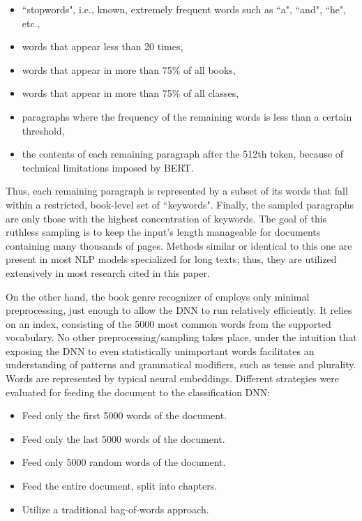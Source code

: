 \documentclass[preprint,review,10pt]{elsarticle}
\begin{document}
	\begin{itemize}
		\item ``stopwords", i.e., known, extremely frequent words such as ``a", ``and", ``he", etc.,
		\item words that appear less than 20 times,
		\item words that appear in more than 75\% of all books,
		\item words that appear in more than 75\% of all classes,
		\item paragraphs where the frequency of the remaining words is less than a certain threshold,
		\item the contents of each remaining paragraph after the 512th token, because of technical limitations imposed by BERT.
	\end{itemize}
	
	Thus, each remaining paragraph is represented by a subset of its words that fall within a restricted, book-level set of ``keywords". Finally, the sampled paragraphs are only those with the highest concentration of keywords. The goal of this ruthless sampling is to keep the input's length manageable for documents containing many thousands of pages. Methods similar or identical to this one are present in most NLP models specialized for long texts; thus, they are utilized extensively in most research cited in this paper.
	
	On the other hand, the book genre recognizer of \cite{worsham} employs only minimal preprocessing, just enough to allow the DNN to run relatively efficiently. It relies on an index, consisting of the 5000 most common words from the supported vocabulary. No other preprocessing/sampling takes place, under the intuition that exposing the DNN to even statistically unimportant words facilitates an understanding of patterns and grammatical modifiers, such as tense and plurality. Words are represented by typical neural embeddings. Different strategies were evaluated for feeding the document to the classification DNN:
	\begin{itemize}
		\item Feed only the first 5000 words of the document.
		\item Feed only the last 5000 words of the document.
		\item Feed only 5000 random words of the document.
		\item Feed the entire document, split into chapters.
		\item Utilize a traditional bag-of-words approach.
	\end{itemize}
	
\end{document}
